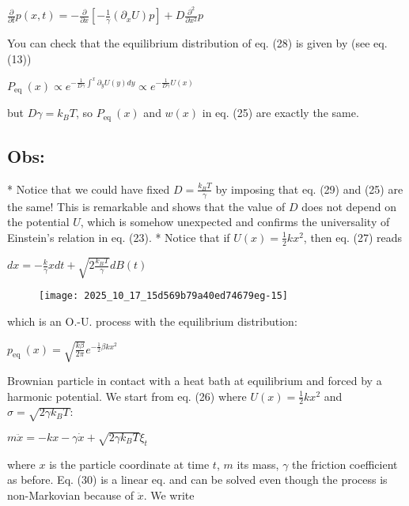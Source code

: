 \begin{DispWithArrows}[tag=28]
    $\frac{\partial}{\partial t} p(x, t)=-\frac{\partial}{\partial x}\left[-\frac{1}{\gamma}\left(\partial_{x} U\right) p\right]+D \frac{\partial^{2}}{\partial x^{2}} p$
\end{DispWithArrows}
You can check that the equilibrium distribution of eq. (28) is given by (see eq. (13))
\begin{DispWithArrows}[tag=29]
    $P_{\text {eq }}(x) \propto e^{-\frac{1}{D \gamma} \int^{x} \partial_{y} U(y) d y} \propto e^{-\frac{1}{D \gamma} U(x)}$
\end{DispWithArrows}
but $D \gamma=k_{B} T$, so $P_{\text {eq }}(x)$ and $w(x)$ in eq. (25) are exactly the same.

\subsection*{Obs:}
    * Notice that we could have fixed $D=\frac{k_{B} T}{\gamma}$ by imposing that eq. (29) and (25) are the same! This is remarkable and shows that the value of $D$ does not depend on the potential $U$, which is somehow unexpected and confirms the universality of Einstein's relation in eq. (23).
    * Notice that if $U(x)=\frac{1}{2} k x^{2}$, then eq. (27) reads
\begin{DispWithArrows}
    $d x=-\frac{k}{\gamma} x d t+\sqrt{2 \frac{k_{B} T}{\gamma}} d B(t)$
\end{DispWithArrows}
\begin{figure}[H]
    \centering
    \texttt{[image: 2025\_10\_17\_15d569b79a40ed74679eg-15]}
\end{figure}
which is an O.-U. process with the equilibrium distribution:
\begin{DispWithArrows}
    $p_{\text {eq }}(x)=\sqrt{\frac{k \beta}{2 \pi}} e^{-\frac{1}{2} \beta k x^{2}}$
\end{DispWithArrows}
Brownian particle in contact with a heat bath at equilibrium and forced by a harmonic potential. We start from eq. (26) where $U(x)=\frac{1}{2} k x^{2}$ and $\sigma=\sqrt{2 \gamma k_{B} T}$:
\begin{DispWithArrows}[tag=30]
    $m \ddot{x}=-k x-\gamma \dot{x}+\sqrt{2 \gamma k_{B} T} \xi_{t}$
\end{DispWithArrows}
where $x$ is the particle coordinate at time $t$, $m$ its mass, $\gamma$ the friction coefficient as before.
Eq. (30) is a linear eq. and can be solved even though the process is non-Markovian because of $\ddot{x}$. We write
